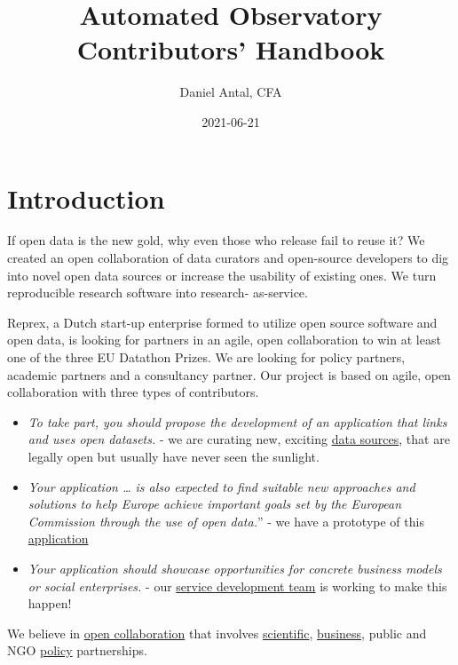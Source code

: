 \documentclass[
  a4paper,
  openany, a4paper, oneside]{book}
\title{Automated Observatory Contributors' Handbook}
\author{Daniel Antal, CFA}
\date{2021-06-21}
\begin{document}
\maketitle

{
\hypersetup{linkcolor=}
\setcounter{tocdepth}{1}
\tableofcontents
}
\listoffigures
{}
\hypertarget{introduction}{%
\chapter*{Introduction}\label{introduction}}

If open data is the new gold, why even those who release fail to reuse it? We created an open collaboration of data curators and open-source developers to dig into novel open data sources or increase the usability of existing ones. We turn reproducible research software into research- as-service.

Reprex, a Dutch start-up enterprise formed to utilize open source software and open data, is looking for partners in an agile, open collaboration to win at least one of the three EU Datathon Prizes. We are looking for policy partners, academic partners and a consultancy partner. Our project is based on agile, open collaboration with three types of contributors.

\begin{itemize}
\item
  \emph{To take part, you should propose the development of an application that links and uses open datasets.} - we are curating new, exciting \protect\hyperlink{data-domains}{data sources}, that are legally open but usually have never seen the sunlight.
\item
  \emph{Your application \ldots{} is also expected to find suitable new approaches and solutions to help Europe achieve important goals set by the European Commission through the use of open data.}'' - we have a prototype of this \protect\hyperlink{tech-solution}{application}
\item
  \emph{Your application should showcase opportunities for concrete business models or social enterprises.} - our \protect\hyperlink{business-solution}{service development team} is working to make this happen!
\end{itemize}

We believe in \href{}{open collaboration} that involves \protect\hyperlink{intro-academic-partners}{scientific}, \protect\hyperlink{intro-business-partners}{business}, public and NGO \protect\hyperlink{intro-policy-partners}{policy} partnerships.
\end{document}
